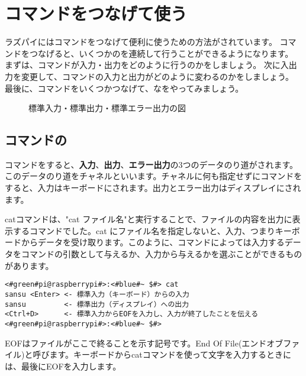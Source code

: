 \newpage
\section{コマンドをつなげて使う}
ラズパイにはコマンドをつなげて便利に使うための方法がされています。
コマンドをつなげると、いくつかのを連続して行うことができるようになります。
まずは、コマンドが入力・出力をどのように行うのかをしましょう。
次に入出力を変更して、コマンドの入力と出力がどのように変わるのかをしましょう。
最後に、コマンドをいくつかつなげて、なをやってみましょう。

\begin{figure}[h]
    \centering
    
    \caption{標準入力・標準出力・標準エラー出力の図}
    \label{ch03:stdioerr}
\end{figure}

\subsection{コマンドの}

コマンドをすると、{\bf {}入力}、{\bf {}出力}、{\bf {}エラー出力}の3つのデータのり道がされます。このデータのり道をチャネルといいます。チャネルに何も指定せずにコマンドをすると、入力はキーボードにされます。出力とエラー出力はディスプレイにされます。

catコマンドは、"cat ファイル名"と実行することで、ファイルの内容を出力に表示するコマンドでした。cat にファイル名を指定しないと、入力、つまりキーボードからデータを受け取ります。このように、コマンドによっては入力するデータをコマンドの引数として与えるか、入力から与えるかを選ぶことができるものがあります。

\begin{lstlisting}[caption=catの標準入力・標準出力, label=stdioCat]
<#green#pi@raspberrypi#>:<#blue#~ $#> cat 
sansu <Enter> <- 標準入力（キーボード）からの入力
sansu         <- 標準出力（ディスプレイ）への出力
<Ctrl+D>      <- 標準入力からEOFを入力し、入力が終了したことを伝える
<#green#pi@raspberrypi#>:<#blue#~ $#>
\end{lstlisting}
EOFはファイルがここで終ることを示す記号です。End Of File(エンドオブファイル)と呼びます。キーボードからcatコマンドを使って文字を入力するときには、最後にEOFを入力します。

